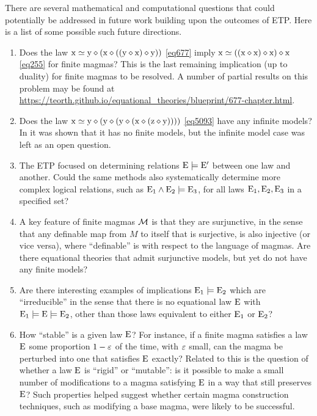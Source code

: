 There are several mathematical and computational questions that could potentially be addressed in future work building upon the outcomes of ETP.  Here is a list of some possible such future directions.
\begin{enumerate}
  \item Does the law $\mathrm{x} \simeq \mathrm{y} \diamond (\mathrm{x} \diamond ((\mathrm{y} \diamond \mathrm{x}) \diamond \mathrm{y}))$ \eqref{eq677} imply $\mathrm{x} \simeq ((\mathrm{x} \diamond \mathrm{x}) \diamond \mathrm{x}) \diamond \mathrm{x}$ \eqref{eq255} for finite magmas? This is the last remaining implication (up to duality) for finite magmas to be resolved.  A number of partial results on this problem may be found at \url{https://teorth.github.io/equational_theories/blueprint/677-chapter.html}.
  \item Does the law $\mathrm{x} \simeq \mathrm{y} \diamond (\mathrm{y} \diamond (\mathrm{y} \diamond (\mathrm{x} \diamond (\mathrm{z} \diamond \mathrm{y}))))$ \eqref{eq5093} have any infinite models? In \cite{Kisielewicz2} it was shown that it has no finite models, but the infinite model case was left as an open question.
  \item The ETP focused on determining relations $\mathrm{E} \models \mathrm{E}'$ between one law and another.  Could the same methods also systematically determine more complex logical relations, such as $\mathrm{E}_1 \wedge \mathrm{E}_2 \models \mathrm{E}_3$, for all laws $\mathrm{E}_1,\mathrm{E}_2,\mathrm{E}_3$ in a specified set?
  \item A key feature of finite magmas ${\mathcal{M}}$ is that they are surjunctive, in the sense that any definable map from $M$ to itself that is surjective, is also injective (or vice versa), where ``definable'' is with respect to the language of magmas.  Are there equational theories that admit surjunctive models, but yet do not have any finite models?
  \item Are there interesting examples of implications $\mathrm{E}_1 \models \mathrm{E}_2$ which are ``irreducible'' in the sense that there is no equational law $\mathrm{E}$ with $\mathrm{E}_1 \models \mathrm{E} \models \mathrm{E}_2$, other than those laws equivalent to either $\mathrm{E}_1$ or $\mathrm{E}_2$?
  \item How ``stable'' is a given law $\mathrm{E}$?  For instance, if a finite magma satisfies a law $\mathrm{E}$ some proportion $1-\varepsilon$ of the time, with $\varepsilon$ small, can the magma be perturbed into one that satisfies $\mathrm{E}$ exactly?  Related to this is the question of whether a law $\mathrm{E}$ is ``rigid'' or ``mutable'': is it possible to make a small number of modifications to a magma satisfying $\mathrm{E}$ in a way that still preserves $\mathrm{E}$?  Such properties helped suggest whether certain magma construction techniques, such as modifying a base magma, were likely to be successful.
\end{enumerate}

